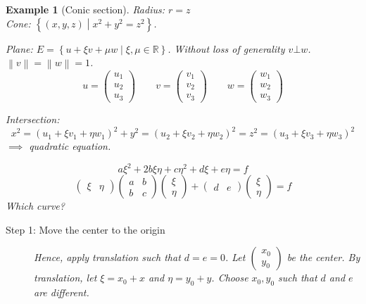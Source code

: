 \documentclass{article}
\newtheorem{example}{Example}  \numberwithin{example}{section}
\newcommand{\set}[1]{\left\{#1\right\}}
\newcommand{\norm}[1]{\left\|#1\right\|}
\begin{document}
\begin{example}[Conic section] %
  Radius: $r = z$ \\
  Cone: $\set{(x, y, z) \middle| x^2 + y^2 = z^2}$.

  Plane: $E = \set{u + \xi v + \mu w \middle| \xi, \mu \in \mathbb R}$.
  Without loss of generality $v \bot w$. $\norm v = \norm w = 1$.
  \[ u = \begin{pmatrix} u_1 \\ u_2 \\ u_3 \end{pmatrix} \qquad v = \begin{pmatrix} v_1 \\ v_2 \\ v_3 \end{pmatrix} \qquad w = \begin{pmatrix} w_1 \\ w_2 \\ w_3 \end{pmatrix} \]

  Intersection:
  \[ x^2 = (u_1 + \xi v_1 + \eta w_1)^2 + y^2 = (u_2 + \xi v_2 + \eta w_2)^2 = z^2 = (u_3 + \xi v_3 + \eta w_3)^2 \]
  $\implies$ quadratic equation.

  \[ a \xi^2 + 2b \xi \eta + c\eta^2 + d\xi + e\eta = f \]
  \[
    \begin{pmatrix} \xi & \eta \end{pmatrix}
    \begin{pmatrix} a & b \\ b & c \end{pmatrix}
    \begin{pmatrix} \xi \\ \eta \end{pmatrix}
    + \begin{pmatrix} d & e \end{pmatrix}
    \begin{pmatrix} \xi \\ \eta \end{pmatrix}
    = f
  \]
  Which curve?

  \begin{description}
    \item[Step 1: Move the center to the origin] 
      Hence, apply translation such that $d = e = 0$.
      Let $\begin{pmatrix} x_0 \\ y_0 \end{pmatrix}$ be the center.
      By translation, let $\xi = x_0 + x$ and $\eta = y_0 + y$.
      Choose $x_0, y_0$ such that $d$ and $e$ are different.


\end{description}
\end{example}
\end{document}
